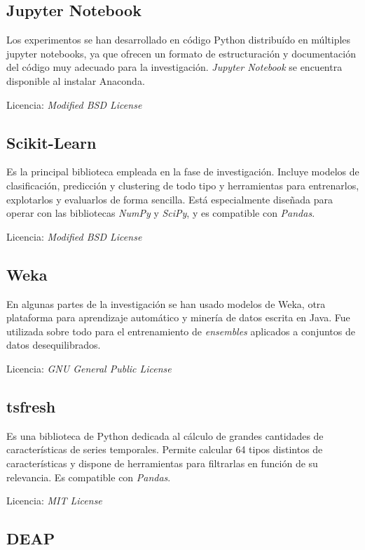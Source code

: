 \subsection{Jupyter Notebook}

Los experimentos se han desarrollado en código Python distribuído en múltiples jupyter notebooks, ya que ofrecen un formato de estructuración y documentación del código muy adecuado para la investigación. \textit{Jupyter Notebook} se encuentra disponible al instalar Anaconda. 

Licencia: \textit{Modified BSD License}


\subsection{Scikit-Learn}

Es la principal biblioteca empleada en la fase de investigación. Incluye modelos de clasificación, predicción y clustering de todo tipo y herramientas para entrenarlos, explotarlos y evaluarlos de forma sencilla. Está especialmente diseñada para operar con las bibliotecas \textit{NumPy} y \textit{SciPy}, y es compatible con \textit{Pandas}.

Licencia: \textit{Modified BSD License } 

\subsection{Weka}

En algunas partes de la investigación se han usado modelos de Weka, otra plataforma para aprendizaje automático y minería de datos escrita en Java. Fue utilizada sobre todo para el entrenamiento de \textit{ensembles} aplicados a conjuntos de datos desequilibrados.

Licencia: \textit{GNU General Public License}

\subsection{tsfresh}

Es una biblioteca de Python dedicada al cálculo de grandes cantidades de características de series temporales. Permite calcular 64 tipos distintos de características y dispone de herramientas para filtrarlas en función de su relevancia. Es compatible con \textit{Pandas}. 

Licencia: \textit{MIT License }

\subsection{DEAP}


